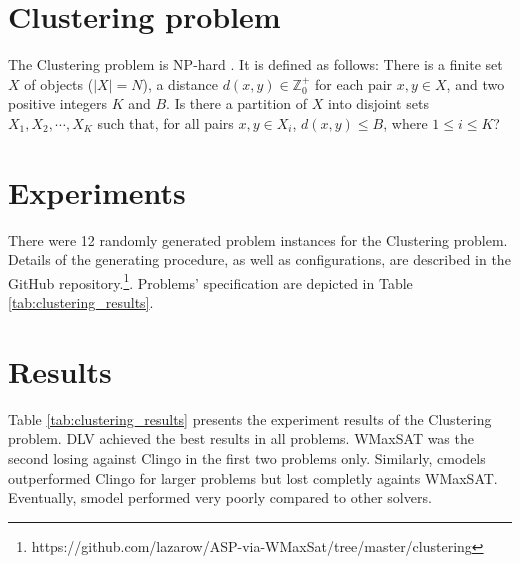 \documentclass[]{article}
\begin{document}
\section{Clustering problem}

The Clustering problem is NP-hard \cite{brucker1978complexity}. It is defined as follows:
There is a finite set $ X $ of objects ($ |X| = N $), a distance $ d(x, y) \in \mathbb{Z}^{+}_{0} $ for each pair
$ x,y \in X $, and two positive integers $ K $ and $ B $. Is there a partition of $ X $ into disjoint sets $ X_1, X_2, \cdots, X_K $
such that, for all pairs $ x,y \in X_i $, $ d(x,y) \leq B $, where $ 1 \leq i \leq K $?

\section{Experiments}

There were 12 randomly generated problem instances for the Clustering problem.
Details of the generating procedure, as well as configurations, are described 
in the GitHub repository.\footnote{https://github.com/lazarow/ASP-via-WMaxSat/tree/master/clustering}.
Problems' specification are depicted in Table \ref{tab:clustering_results}.

\section{Results}

Table \ref{tab:clustering_results} presents the experiment results of the Clustering problem.
DLV achieved the best results in all problems. WMaxSAT was the second losing against Clingo in the first two problems only.
Similarly, cmodels outperformed Clingo for larger problems but lost completly againts WMaxSAT.
Eventually, smodel performed very poorly compared to other solvers.
\end{document}
